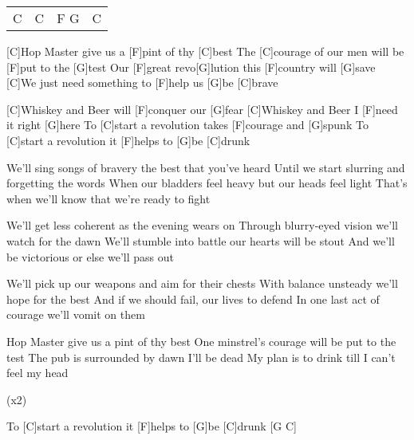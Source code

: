 

\begin{guitar}
	{\footnotesize\begin{tabular}{l|l|l|l}
			C & C & F G & C
	\end{tabular}}

	[C]Hop Master give us a [F]pint of thy [C]best
	The [C]courage of our men will be [F]put to the [G]test
	Our [F]great revo[G]lution this [F]country will [G]save
	[C]We just need something to [F]help us [G]be [C]brave
	
	[C]Whiskey and Beer will [F]conquer our [G]fear
	[C]Whiskey and Beer I [F]need it right [G]here
	To [C]start a revolution takes [F]courage and [G]spunk
	To [C]start a revolution it [F]helps to [G]be [C]drunk
	
	We'll sing songs of bravery the best that you've heard
	Until we start slurring and forgetting the words
	When our bladders feel heavy but our heads feel light
	That's when we'll know that we're ready to fight
	
	 
	
	We'll get less coherent as the evening wears on
	Through blurry-eyed vision we'll watch for the dawn
	We'll stumble into battle our hearts will be stout
	And we'll be victorious or else we'll pass out
	
	 
	
	We'll pick up our weapons and aim for their chests
	With balance unsteady we'll hope for the best
	And if we should fail, our lives to defend
	In one last act of courage we'll vomit on them
	
	 
	
	Hop Master give us a pint of thy best
	One minstrel's courage will be put to the test
	The pub is surrounded by dawn I'll be dead
	My plan is to drink till I can't feel my head
	
	  (x2)
	
	To [C]start a revolution it [F]helps to [G]be [C]drunk [G C]{}
\end{guitar}